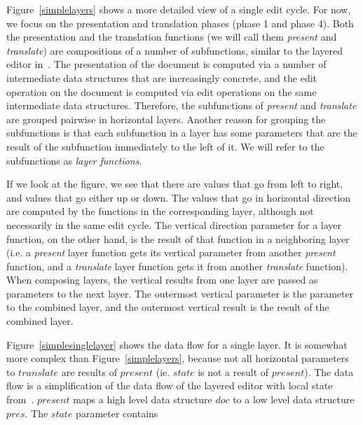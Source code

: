 \par 
\par {}Figure~\ref{simplelayers} shows a more detailed view of a single edit cycle. For
      now, we focus on the presentation and translation phases (phase 1 and phase 4).
      Both the presentation and the translation functions (we will call them
      {\em present} and {\em translate}) are compositions of a number of
      subfunctions, similar to the layered editor in~\cite{architecture}.
      The presentation of the document is computed via a number of intermediate data
      structures that are increasingly concrete, and the edit operation on the
      document is computed via edit operations on the same intermediate data
      structures. Therefore, the subfunctions of {\em present} and
      {\em translate} are grouped pairwise in horizontal layers. Another reason
      for grouping the subfunctions is that each subfunction in a layer has some
      parameters that are the result of the subfunction immediately to the left of
      it. We will refer to the subfunctions as {\em layer functions}.
\par If we look at the figure, we see that there are values that go from left
      to right, and values that go either up or down. The values that go in
      horizontal direction are computed by the functions in the corresponding layer,
      although not necessarily in the same edit cycle. The vertical direction
      parameter for a layer function, on the other hand, is the result of that
      function in a neighboring layer (i.e. a {\em present} layer function gets
      its vertical parameter from another {\em present} function, and a
      {\em translate} layer function gets it from another {\em translate}
      function). When composing layers, the vertical results from one layer are
      passed as parameters to the next layer. The outermost vertical parameter is the
      parameter to the combined layer, and the outermost vertical result is the
      result of the combined layer. 
\par {}Figure~\ref{simplesinglelayer} shows the data flow for a single layer. It is
      somewhat more complex than Figure~\ref{simplelayers}, because
      not all horizontal parameters to $translate$ are results of $present$ (ie. $state$ is not a result of $present$). The data flow is a
      simplification of the data flow of the layered editor with local state
      from~\cite{architecture}. $present$ maps a high level data structure
      $doc$ to a low level data structure $pres$. The $state$ parameter contains
